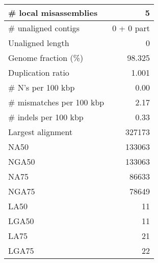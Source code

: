 \documentclass[12pt,a4paper]{article}
\begin{document}
\begin{table}[ht]
\begin{center}
\begin{tabular}{|l*{1}{|r}|}
\# local misassemblies & 5 \\ \hline
\# unaligned contigs & 0 + 0 part \\ \hline
Unaligned length & 0 \\ \hline
Genome fraction (\%) & 98.325 \\ \hline
Duplication ratio & 1.001 \\ \hline
\# N's per 100 kbp & 0.00 \\ \hline
\# mismatches per 100 kbp & 2.17 \\ \hline
\# indels per 100 kbp & 0.33 \\ \hline
Largest alignment & 327173 \\ \hline
NA50 & 133063 \\ \hline
NGA50 & 133063 \\ \hline
NA75 & 86633 \\ \hline
NGA75 & 78649 \\ \hline
LA50 & 11 \\ \hline
LGA50 & 11 \\ \hline
LA75 & 21 \\ \hline
LGA75 & 22 \\ \hline
\end{tabular}
\end{center}
\end{table}
\end{document}
